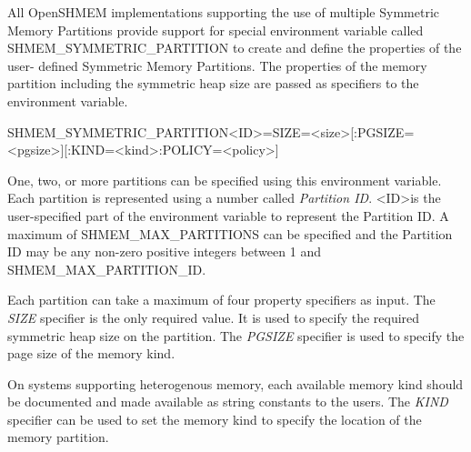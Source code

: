 All OpenSHMEM implementations supporting the use of multiple Symmetric Memory
Partitions provide support for special environment variable called
SHMEM\_SYMMETRIC\_PARTITION to create and define the properties of the user-
defined Symmetric Memory Partitions. The properties of the memory partition
including the symmetric heap size are passed as specifiers to the environment
variable. 

\begin{envvardefinition}
\begin{envvarname}
SHMEM_SYMMETRIC_PARTITION<ID>=SIZE=<size>[:PGSIZE=<pgsize>][:KIND=<kind>:POLICY=<policy>]
\end{envvarname}

\begin{envvararguments}
\end{envvararguments}

One, two, or more partitions can be specified using this environment variable.
Each partition is represented using a number called \emph{Partition ID}.
\textless ID\textgreater is the user-specified part of the environment variable
to represent the Partition ID. A maximum of SHMEM\_MAX\_PARTITIONS can be
specified and the Partition ID may be any non-zero positive integers between 1
and SHMEM\_MAX\_PARTITION\_ID.

Each partition can take a maximum of four property specifiers as input. The
\emph{SIZE} specifier is the only required value. It is used to specify the
required symmetric heap size on the partition. The \emph{PGSIZE} specifier is
used to specify the page size of the memory kind.

On systems supporting heterogenous memory, each available memory kind should be
documented and made available as string constants to the users. The \emph{KIND}
specifier can be used to set the memory kind to specify the location of the
memory partition.




\end{envvardefinition}

